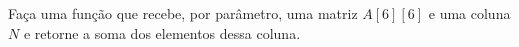 
\question[10]

Faça uma função que recebe, por parâmetro, uma matriz $A[6][6]$ e uma coluna $N$ e retorne a soma dos elementos dessa coluna.